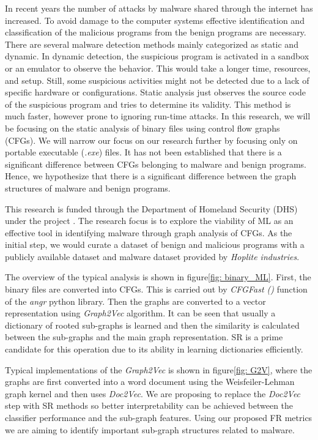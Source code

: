 In recent years the number of attacks by malware shared through the internet has increased. To avoid damage to the computer systems effective identification and classification of the malicious programs from the benign programs are necessary. There are several malware detection methods mainly categorized as static and dynamic\cite{Akhtar2021}. In dynamic detection, the suspicious program is activated in a sandbox or an emulator to observe the behavior. This would take a longer time, resources, and setup. Still, some suspicious activities might not be detected due to a lack of specific hardware or configurations. Static analysis just observes the source code of the suspicious program and tries to determine its validity. This method is much faster, however prone to ignoring run-time attacks. In this research, we will be focusing on the static analysis of binary files using control flow graphs (CFGs). We will narrow our focus on our research further by focusing only on portable executable (\textit{.exe}) files. It has not been established that there is a significant difference between CFGs belonging to malware and benign programs. Hence, we hypothesize that there is a significant difference between the graph structures of malware and benign programs.

This research is funded through the Department of Homeland Security (DHS) under the project . The research focus is to explore the viability of ML as an effective tool in identifying malware through graph analysis of CFGs. As the initial step, we would curate a dataset of benign and malicious programs with a publicly available dataset and malware dataset provided by \textit{Hoplite industries}.

The overview of the typical analysis is shown in figure\ref{fig: binary_ML}. First, the binary files are converted into CFGs. This is carried out by \textit{CFGFast ()} function of the \textit{angr} python library\cite{shoshitaishvili2016state, stephens2016driller, shoshitaishvili2015firmalice }. Then the graphs are converted to a vector representation using \textit{Graph2Vec} algorithm\cite{Narayanan2017}. It can be seen that usually a dictionary of rooted sub-graphs is learned and then the similarity is calculated between the sub-graphs and the main graph representation. SR is a prime candidate for this operation due to its ability in learning dictionaries efficiently.

Typical implementations of the \textit{Graph2Vec} is shown in figure\ref{fig: G2V}, where the graphs are first converted into a word document using the Weisfeiler-Lehman graph kernel\cite{Shervashidze2011} and then uses \textit{Doc2Vec}\cite{Le2014}. We are proposing to replace the \textit{Doc2Vec} step with SR methods so better interpretability can be achieved between the classifier performance and the sub-graph features. Using our proposed FR metrics we are aiming to identify important sub-graph structures related to malware. 

